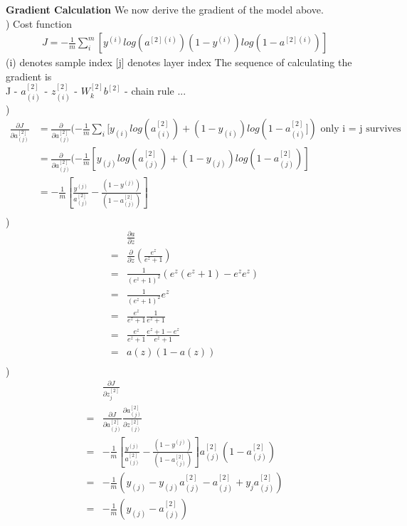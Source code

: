 \documentclass[a4paper]{article}
\begin{document}
{\bf Gradient Calculation}
We now derive the gradient of the model above.\\
) Cost function\\
\begin{align*}
	J = -\frac{1}{m} \sum_i^m[y^{(i)} log(a^{[2](i)})
	(1-y^{(i)}) log(1 - a^{[2](i)})]
\end{align*}
(i) denotes sample index
[j] denotes layer index
The sequence of calculating the gradient is \\
J - $a_{(i)}^{[2]}$ - $z_{(i)}^{[2]}$ - $W_k^{[2]} b^{[2]}$ - chain rule ...\\
) \\
\begin{align*}
\frac{\partial J}{\partial a_{(j)}^{[2]}}
& = \frac{\partial }{\partial a_{(j)}^{[2]}} (-\frac{1}{m} \sum_i [y_{(i)} log(a^{[2]}_{(i)})
	+ (1-y_{(i)}) log(1 - a^{[2]}_{(i)}]) \textrm{ only i = j survives}\\
& = \frac{\partial }{\partial a_{(j)}^{[2]}} (-\frac{1}{m}  [y_{(j)} log(a^{[2]}_{(j)})
	+ (1-y_{(j)}) log(1 - a^{[2]}_{(j)})]\\
& = -\frac{1}{m}  [\frac{y^{(j)}}{ a^{[2]}_{(j)}}
	-\frac{(1-y^{(j)})}{ (1 - a^{[2]}_{(j)})}]\\
\end{align*}
) \\
\begin{align*}
  &\frac{\partial a}{\partial z}\\
= & \frac{\partial}{\partial z}(\frac{e^z}{e^z + 1}) \\
= &\frac{1}{(e^z + 1)^2} (e^z(e^z + 1) -e^z e^z) \\
= &\frac{1}{(e^z + 1)^2} e^z \\
= &\frac{e^z}{e^z + 1} \frac{1}{e^z +1} \\
= &\frac{e^z}{e^z + 1} \frac{e^z + 1 -e^z}{e^z +1}\\
= & a(z) (1 -a(z))\\
\end{align*}
)
\begin{align*}
	 &\frac{\partial J}{\partial z_{j}^{[2]}} \\
   = &\frac{\partial J }{\partial a_{(j)}^{[2]}} \frac{\partial a_{(j)}^{[2]} }{\partial z_{(j)}^{[2]}} \\
   = &-\frac{1}{m}  [\frac{y^{(j)}}{ a^{[2]}_{(j)}}
	-\frac{(1-y^{(j)})}{ (1 - a^{[2]}_{(j)})}]
    a^{[2]}_{(j)} (1 - a^{[2]}_{(j)}) \\
   = &-\frac{1}{m} (y_{(j)} - y_{(j)} a_{(j)} ^{[2]} - a_{(j)}^{[2]} + y_{{j}}a_{(j)}^{[2]}) \\   
   =& -\frac{1}{m} (y_{(j)} - a_{(j)}^{[2]})\\   
\end{align*}
\end{document}
